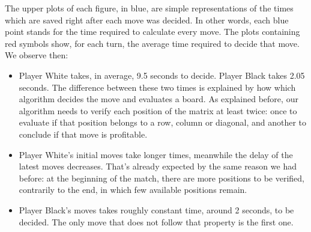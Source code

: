 \FloatBarrier

The upper plots of each figure, in blue, are simple representations of the
times which are saved right after each move was decided. In other words, each
blue point stands for the time required to calculate every move. The plots
containing red symbols show, for each turn, the average time required to decide
that move. We observe then:

\begin{itemize}
	\item Player White takes, in average, 9.5 seconds to decide. Player Black takes
	2.05 seconds. The difference between these two times is explained by how which
	algorithm decides the move and evaluates a board. As explained before, our
	algorithm needs to verify each position of the matrix at least twice: once to
	evaluate if that position belongs to a row, column or diagonal, and another to
	conclude if that move is profitable.
	\item Player White’s initial moves take longer times, meanwhile the delay of
	the latest moves decreases. That’s already expected by the same reason we had
	before: at the beginning of the  match, there are more positions to be
	verified, contrarily to the end, in which few available positions remain.
	\item Player Black's moves takes roughly constant time, around 2 seconds, to
	be decided. The only move that does not follow that property is the first one.

\end{itemize}

\newpage